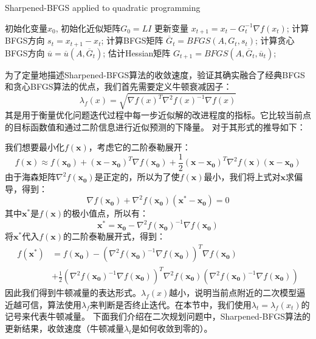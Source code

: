 \documentclass[a4paper,twoside,AutoFakeBold]{article}
\theoremstyle{definition}
\begin{document}
\begin{algorithm}[H]\xiaosi
    \caption{\xiaosi Sharpened-BFGS applied to quadratic programming}
    \begin{algorithmic}
        \REQUIRE 初始化变量$x_0$, 初始化近似矩阵$G_0=LI$
            \STATE 更新变量 $x_{t+1}=x_t-G_t^{-1}\nabla f(x_t)$;
            \STATE 计算BFGS方向 $s_t=x_{t+1}-x_t$;
            \STATE 计算BFGS矩阵 $\overline{G}_t=BFGS(A,G_t,s_t)$;
            \STATE 计算贪心BFGS方向 $\overline{u}=\overline{u} (A,\overline{G}_t)$;
            \STATE 估计Hessian矩阵 $G_{t+1}=BFGS(A,\overline{G}_t,\overline{u}_t)$;
        \ENDFOR
    \end{algorithmic}
\end{algorithm}

为了定量地描述Sharpened-BFGS算法的收敛速度，验证其确实融合了经典BFGS和贪心BFGS算法的优点，我们首先需要定义牛顿衰减因子：
\begin{equation}
    \lambda_f (x)=\sqrt{\nabla f(x)^T\nabla ^2 f(x)^{-1}\nabla f(x)}
\end{equation}
其是用于衡量优化问题迭代过程中每一步近似解的改进程度的指标。它比较当前点的目标函数值和通过二阶信息进行近似预测的下降量。
对于其形式的推导如下：

我们想要最小化$f(\bm{x})$，考虑它的二阶泰勒展开：
\begin{equation}
    f(\bm{x})\approx f(\bm{x_0})+(\bm{x}-\bm{x_0})^T\nabla f(\bm{x_0})+\frac{1}{2}(\bm{x}-\bm{x_0})^T\nabla^2 f(\bm{x})(\bm{x}-\bm{x_0})
\end{equation}
由于海森矩阵$\nabla^2 f(\bm{x_0})$是正定的，所以为了使$f(\bm{x})$最小，我们将上式对$\bm{x}$求偏导，得到：
\begin{equation}
        \nabla f(\bm{x_0})+\nabla ^2 f(\bm{x_0})(\bm{x^{*}}-\bm{x_0})=0
\end{equation}
其中$\bm{x^{*}}$是$f(\bm{x})$的极小值点，所以有：
\begin{equation}
    \bm{x^{*}}=\bm{x_0}-\nabla ^2 f(\bm{x_0})^{-1}\nabla f(\bm{x_0})
\end{equation}
将$\bm{x^{*}}$代入$f(\bm{x})$的二阶泰勒展开式，得到：
\begin{equation}
    \begin{aligned}
    f(\bm{x^{*}})&=f(\bm{x_0})-(\nabla^2f(\bm{x_0})^{-1}\nabla f(\bm{x_0}))^T\nabla f(\bm{x_0})\\
    &+\frac{1}{2}(\nabla^2f(\bm{x_0})^{-1}\nabla f(\bm{x_0}))^T\nabla^2f(\bm{x_0})(\nabla^2f(\bm{x_0})^{-1}\nabla f(\bm{x_0}))
    \end{aligned}
\end{equation}
因此我们得到牛顿减量的表达形式。$\lambda_f(x)$越小，说明当前点附近的二次模型逼近越可信，算法使用$\lambda_f$来判断是否终止迭代。在本节中，我们使用$\lambda_t=\lambda_f(x_t)$的记号来代表牛顿减量。
下面我们介绍在二次规划问题中，Sharpened-BFGS算法的更新结果，收敛速度（牛顿减量$\lambda_t$是如何收敛到零的）。
\end{document}
